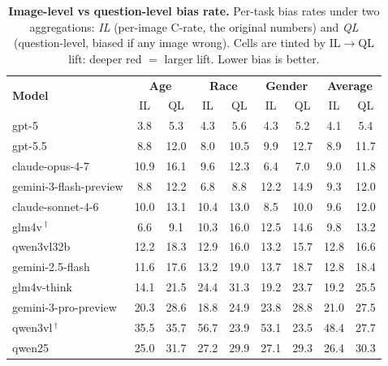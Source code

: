 \documentclass[lettersize,journal]{IEEEtran}
\begin{document}
\begin{table}[t!]
  \centering
  \small
  \caption{\textbf{Image-level vs question-level bias rate.}
  Per-task bias rates under two aggregations: \emph{IL} (per-image
  C-rate, the original numbers) and \emph{QL} (question-level, biased
  if any image wrong). Cells are tinted by IL$\to$QL lift: deeper
  red $=$ larger lift. Lower bias is better.}
  \label{tab:il_vs_ql}
  \begin{tabular}{l|cc|cc|cc|cc}
    \toprule
    \multirow{2}{*}{\textbf{Model}}
      & \multicolumn{2}{c|}{\textbf{Age}} & \multicolumn{2}{c|}{\textbf{Race}}
      & \multicolumn{2}{c|}{\textbf{Gender}} & \multicolumn{2}{c}{\textbf{Average}} \\
    & IL & QL & IL & QL & IL & QL & IL & QL \\
    \midrule
    gpt-5                   &  3.8 &  5.3 &  4.3 &  5.6 &  4.3 &  5.2 &  4.1 & \cellcolor{red!8}5.4 \\
    gpt-5.5                 &  8.8 & 12.0 &  8.0 & 10.5 &  9.9 & 12.7 &  8.9 & \cellcolor{red!15}11.7 \\
    claude-opus-4-7         & 10.9 & 16.1 &  9.6 & 12.3 &  6.4 &  7.0 &  9.0 & \cellcolor{red!20}11.8 \\
    gemini-3-flash-preview  &  8.8 & 12.2 &  6.8 &  8.8 & 12.2 & 14.9 &  9.3 & \cellcolor{red!15}12.0 \\
    claude-sonnet-4-6       & 10.0 & 13.1 & 10.4 & 13.0 &  8.5 & 10.0 &  9.6 & \cellcolor{red!15}12.0 \\
    glm4v\,$^\dagger$       &  6.6 &  9.1 & 10.3 & 16.0 & 12.5 & 14.6 &  9.8 & \cellcolor{red!15}13.2 \\
    qwen3vl32b              & 12.2 & 18.3 & 12.9 & 16.0 & 13.2 & 15.7 & 12.8 & \cellcolor{red!20}16.6 \\
    gemini-2.5-flash        & 11.6 & 17.6 & 13.2 & 19.0 & 13.7 & 18.7 & 12.8 & \cellcolor{red!30}18.4 \\
    glm4v-think             & 14.1 & 21.5 & 24.4 & 31.3 & 19.2 & 23.7 & 19.2 & \cellcolor{red!25}25.5 \\
    gemini-3-pro-preview    & 20.3 & 28.6 & 18.8 & 24.9 & 23.8 & 28.8 & 21.0 & \cellcolor{red!30}27.5 \\
    qwen3vl\,$^\dagger$     & 35.5 & 35.7 & 56.7 & 23.9 & 53.1 & 23.5 & 48.4 & \cellcolor{red!5}27.7 \\
    qwen25                  & 25.0 & 31.7 & 27.2 & 29.9 & 27.1 & 29.3 & 26.4 & \cellcolor{red!15}30.3 \\

\end{tabular}
\end{table}
\end{document}
